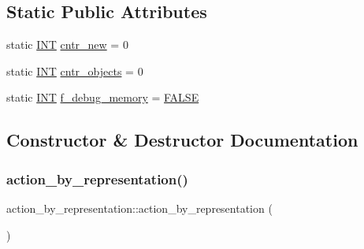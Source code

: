 \subsection*{Static Public Attributes}
\begin{DoxyCompactItemize}
\item 
static \mbox{\hyperlink{galois_8h_a09fddde158a3a20bd2dcadb609de11dc}{I\+NT}} \mbox{\hyperlink{classaction__by__representation_a09d6cd3cb51be765106301cfbeab9457}{cntr\+\_\+new}} = 0
\item 
static \mbox{\hyperlink{galois_8h_a09fddde158a3a20bd2dcadb609de11dc}{I\+NT}} \mbox{\hyperlink{classaction__by__representation_a53acb542e3a3eae3e8a9301025edac8f}{cntr\+\_\+objects}} = 0
\item 
static \mbox{\hyperlink{galois_8h_a09fddde158a3a20bd2dcadb609de11dc}{I\+NT}} \mbox{\hyperlink{classaction__by__representation_a1878aadf5980495a18a76f8bc0063614}{f\+\_\+debug\+\_\+memory}} = \mbox{\hyperlink{nauty_8h_aa93f0eb578d23995850d61f7d61c55c1}{F\+A\+L\+SE}}
\end{DoxyCompactItemize}


\subsection{Constructor \& Destructor Documentation}
\mbox{\label{classaction__by__representation_aef60b4ecc561fafacb3bdeac5654c368}} 
\subsubsection{\texorpdfstring{action\+\_\+by\+\_\+representation()}{action\_by\_representation()}}
{\footnotesize\ttfamily action\+\_\+by\+\_\+representation\+::action\+\_\+by\+\_\+representation (\begin{DoxyParamCaption}{ }\end{DoxyParamCaption})}

\mbox{\label{classaction__by__representation_a29225e48aef1539cccf31a42137f74dc}} 
